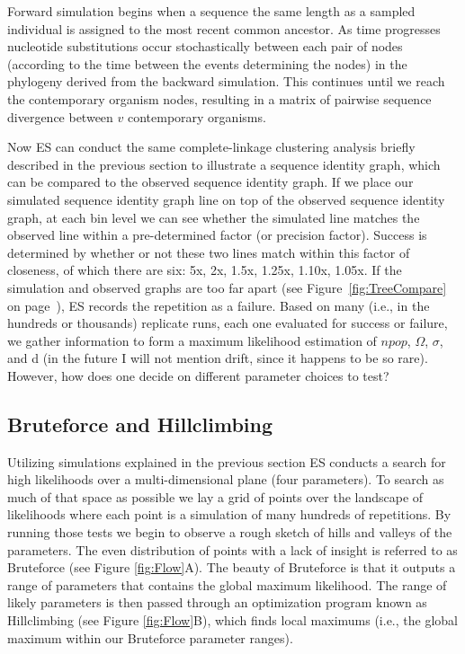 Forward simulation begins when a sequence the same length as a sampled individual is assigned to the most recent common ancestor.
As time progresses nucleotide substitutions occur stochastically between each pair of nodes (according to the time between the events determining the nodes) in the phylogeny derived from the backward simulation. 
This continues until we reach the contemporary organism nodes, resulting in a matrix of pairwise sequence divergence between $v$ contemporary organisms.

Now ES can conduct the same complete-linkage clustering analysis briefly described in the previous section to illustrate a sequence identity graph, which can be compared to the observed sequence identity graph.
If we place our simulated sequence identity graph line on top of the observed sequence identity graph, at each bin level we can see whether the simulated line matches the observed line within a pre-determined factor (or precision factor).
Success is determined by whether or not these two lines match within this factor of closeness, of which there are six: 5x, 2x, 1.5x, 1.25x, 1.10x, 1.05x.
If the simulation and observed graphs are too far apart (see Figure~\ref{fig:TreeCompare} on page~\pageref{fig:TreeCompare}), ES records the repetition as a failure.
Based on many (i.e., in the hundreds or thousands) replicate runs, each one evaluated for success or failure, we gather information to form a maximum likelihood estimation of $npop$, $\Omega$, $\sigma$, and d (in the future I will not mention drift, since it happens to be so rare). However, how does one decide on different parameter choices to test?

\subsection*{Bruteforce and Hillclimbing}
Utilizing simulations explained in the previous section ES conducts a search for high likelihoods over a multi-dimensional plane (four parameters).
To search as much of that space as possible we lay a grid of points over the landscape of likelihoods where each point is a simulation of many hundreds of repetitions.
By running those tests we begin to observe a rough sketch of hills and valleys of the parameters.
The even distribution of points with a lack of insight is referred to as Bruteforce (see Figure \ref{fig:Flow}A).
The beauty of Bruteforce is that it outputs a range of parameters that contains the global maximum likelihood.
The range of likely parameters is then passed through an optimization program known as Hillclimbing (see Figure \ref{fig:Flow}B), which finds local maximums (i.e., the global maximum within our Bruteforce parameter ranges).

